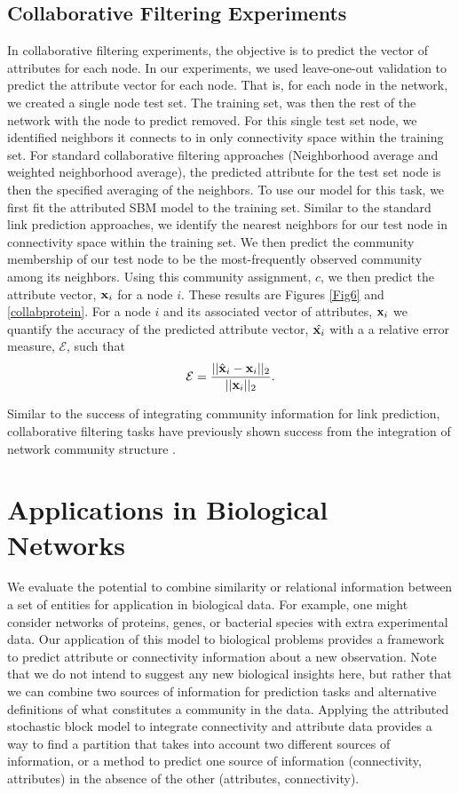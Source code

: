 \documentclass[10pt,journal,compsoc]{IEEEtran}
\begin{document}
\subsection{Collaborative Filtering Experiments}
In collaborative filtering experiments, the objective is to predict the vector of attributes for each node. In our experiments, we used leave-one-out validation to predict the attribute vector for each node. That is, for each node in the network, we created a single node test set. The training set, was then the rest of the network with the node to predict removed. For this single test set node, we identified neighbors it connects to in only connectivity space within the training set. For standard collaborative filtering approaches (Neighborhood average and weighted neighborhood average), the predicted attribute for the test set node is then the specified averaging of the neighbors. To use our model for this task, we first fit the attributed SBM model to the training set. Similar to the standard link prediction approaches, we identify the nearest neighbors for our test node in connectivity space within the training set. We then predict the community membership of our test node to be the most-frequently observed community among its neighbors. Using this community assignment, $c$, we then predict the attribute vector, ${\bf x}_{i}$ for a node $i$. These results are Figures \ref{Fig6} and \ref{collabprotein}. For a node $i$ and its associated vector of attributes, ${\bf x}_{i}$ we quantify the accuracy of the predicted attribute vector, $\hat{{\bf x}_{i}}$ with a a relative error measure, $\mathcal{E}$, such that 
\begin{equation}
\mathcal{E}=\frac{||\hat{\bf{x}}_{i}-{\bf x}_{i}||_{2}}{||{\bf x}_{i}||_{2}}.
\end{equation}

Similar to the success of integrating community information for link prediction, collaborative filtering tasks have previously shown success from the integration of network community structure \cite{collabComm}. 

\section{Applications in Biological Networks}
We evaluate the potential to combine similarity or relational information between a set of entities for application in biological data. For example, one might consider networks of proteins, genes, or bacterial species with extra experimental data. Our application of this model to biological problems provides a framework to predict attribute or connectivity information about a new observation.  Note that we do not intend to suggest any new biological insights here, but rather that we can combine two sources of information for prediction tasks and alternative definitions of what constitutes a community in the data. Applying the attributed stochastic block model to integrate connectivity and attribute data provides a way to find a partition that takes into account two different sources of information, or a method to predict one source of information (connectivity, attributes) in the absence of the other (attributes, connectivity). 
\end{document}
